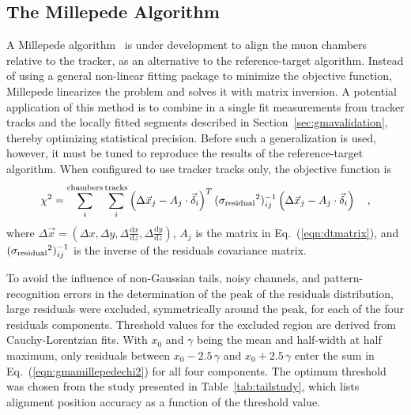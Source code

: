 \subsection{The Millepede Algorithm}
\label{sec:mpalgo}

A Millepede algorithm~\cite{Blobel:2006yh} is under development to
align the muon chambers relative to the tracker, as an alternative to
the reference-target algorithm.  Instead of using a general non-linear
fitting package to minimize the objective function, Millepede
linearizes the problem and solves it with matrix inversion.  A
potential application of this method is to combine in a single fit
measurements from tracker tracks and the locally fitted segments
described in Section~\ref{sec:gmavalidation}, thereby optimizing
statistical precision.  Before such a generalization is used, however,
it must be tuned to reproduce the results of the reference-target
algorithm.  When configured to use tracker tracks only, the objective
function is
\begin{equation}
\chi^2 = \sum_i^{\mbox{\scriptsize chambers}} \sum_i^{\mbox{\scriptsize tracks}}
\left(\Delta \vec{x}_j - A_j \cdot \vec{\delta}_i\right)^T
({\sigma_{\mbox{\scriptsize residual}}}^2)^{-1}_{ij}
\left(\Delta \vec{x}_j - A_j \cdot \vec{\delta}_i\right) \quad\mbox{,}
\label{eqn:gmamillepedechi2}
\end{equation}
where $\Delta \vec{x} = (\Delta x, \Delta
y, \Delta \frac{\textrm{d}x}{\textrm{d}z}, \Delta \frac{\textrm{d}y}{\textrm{d}z})$, $A_j$ is the
matrix in Eq.~(\ref{eqn:dtmatrix}), and
$({\sigma_{\mbox{\scriptsize residual}}}^2)^{-1}_{ij}$ is the inverse
of the residuals covariance matrix.

To avoid the influence of non-Gaussian tails, noisy channels, and
pattern-recognition errors in the determination of the peak of the residuals distribution,
large residuals were excluded, symmetrically around the peak, for
each of the four residuals components.  Threshold values for the
excluded region are derived from Cauchy-Lorentzian fits.  With $x_0$ and
$\gamma$ being the mean and half-width at half maximum,
only residuals between $x_0 - 2.5 \, \gamma$ and $x_0 + 2.5 \, \gamma$
enter the sum in Eq.~(\ref{eqn:gmamillepedechi2}) for all
four components.  The
optimum threshold was chosen from the study presented in
Table~\ref{tab:tailstudy}, which lists alignment position accuracy as
a function of the threshold value.

